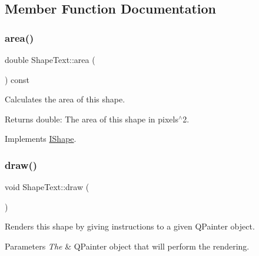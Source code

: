 \subsection{Member Function Documentation}
\mbox{\label{class_shape_text_ae7af61e4159b53963fa6342024baca70}} 
\subsubsection{\texorpdfstring{area()}{area()}}
{\footnotesize\ttfamily double Shape\+Text\+::area (\begin{DoxyParamCaption}{ }\end{DoxyParamCaption}) const\hspace{0.3cm}{\ttfamily [virtual]}}



Calculates the area of this shape. 

\begin{DoxyReturn}{Returns}
double\+: The area of this shape in pixels$^\wedge$2. 
\end{DoxyReturn}


Implements \mbox{\hyperlink{class_i_shape_aed742a160acdd13c9cfdeb16e605afea}{I\+Shape}}.

\mbox{\label{class_shape_text_a554bed75c86d0ca7d555eefbc7aff7dc}} 
\subsubsection{\texorpdfstring{draw()}{draw()}}
{\footnotesize\ttfamily void Shape\+Text\+::draw (\begin{DoxyParamCaption}\item[{Q\+Painter \&}]{ }\end{DoxyParamCaption})\hspace{0.3cm}{\ttfamily [virtual]}}



Renders this shape by giving instructions to a given Q\+Painter object. 


\begin{DoxyParams}{Parameters}
{\em The} & Q\+Painter object that will perform the rendering. \\
\hline
\end{DoxyParams}


